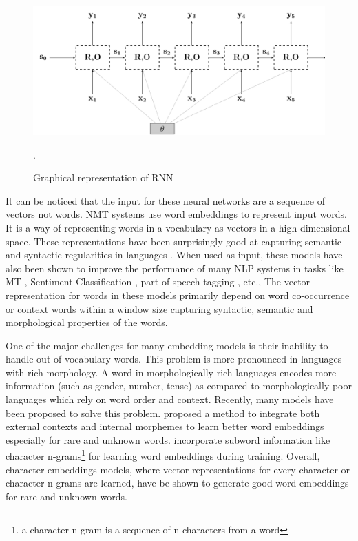 \begin{figure}[ht]
	\centering
	\includegraphics[scale=0.3]{images/rnn}
	\caption{Graphical representation of RNN \citep{goldberg2016primer}}.
	\label{rnn}
\end{figure}


It can be noticed that the input for these neural networks are a sequence of vectors not words. NMT systems use word embeddings to represent input words. It is a way of representing words in a vocabulary as vectors in a high dimensional space. These representations have been surprisingly good at capturing semantic and syntactic regularities in languages \citep{mikolov2013distributed}. When used as input, these models have also been shown to improve the performance of many NLP systems in tasks like MT \citep{vaswani2017attention, sennrich2015neural}, Sentiment Classification \citep{kumar2016ask}, part of speech tagging \citep{kumar2016ask}, etc., The vector representation for words in these models primarily depend on word co-occurrence or context words within a window size capturing syntactic, semantic and morphological properties of the words. 




One of the major challenges for many embedding models is their inability to handle out of vocabulary words.  This problem is more pronounced in languages with rich morphology. A word in morphologically rich languages encodes more information (such as gender, number, tense) as compared to morphologically poor languages which rely on word order and context. Recently, many models have been proposed to solve this problem. \cite{sun2016inside} proposed a method to integrate both external contexts and internal morphemes to learn better word embeddings especially for rare and unknown words. \cite{bojanowski2016enriching} incorporate subword information like character n-grams\footnote{a character n-gram is a sequence of n characters from a word} for learning word embeddings during training. Overall, character embeddings models, where vector representations for every character or character n-grams are learned, have be shown to generate good word embeddings for rare and unknown words. 

